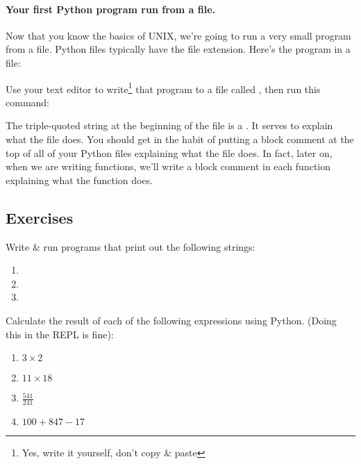 \paragraph{Your first Python program run from a file.}

Now that you know the basics of UNIX, we're going to run a very small
program from a file. Python files typically have the  file
extension. Here's the  program in a file:


Use your text editor to write\footnote{Yes, write it yourself, don't
  copy \& paste} that program to a file called ,
then run this command:


\begin{remark}
  The triple-quoted string at the beginning of the file is a
  . It serves to explain what the file does. You
  should get in the habit of putting a block comment at the top of all
  of your Python files explaining what the file does. In fact, later
  on, when we are writing functions, we'll write a block comment in
  each function explaining what the function does.
\end{remark}

\subsection{Exercises}

\begin{exercise}
  Write \& run programs that print out the following strings:

  \begin{enumerate}
  \item {}
  \item {}
  \item {}
  \end{enumerate}
\end{exercise}

\begin{exercise}
  Calculate the result of each of the following expressions using
  Python. (Doing this in the REPL is fine):

  \begin{enumerate}
  \item $3 \times 2$
  \item $11 \times 18$
  \item $\frac{541}{241}$
  \item $100 + 847 - 17$
  \end{enumerate}
\end{exercise}

